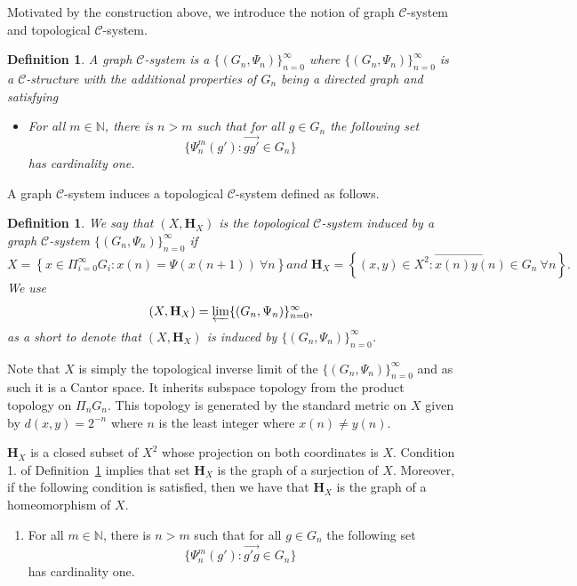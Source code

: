 \documentclass[11pt]{amsart}
\newtheorem{definition}[theorem]{Definition}
\newcommand{\N}{\mathbb{N}}  %
\newcommand{\oa}{\overrightarrow}
\newcommand{\homeocantor}{{\mathbf H}_{X}}
\newcommand{\cC}{\mathcal{C}}
\newcommand{\csystem}{\{(G_n,\Psi_n)\}_{n=0}^{\infty}}
\begin{document}
{Motivated by the construction above, we introduce the notion of graph $\cC$-system and topological $\cC$-system.

\begin{definition}\label{def:graphcsystem}
A \emph{graph $\cC$-system} is a  $\csystem$ where $\csystem$ is a $\cC$-structure with the additional properties of $G_n$ being a directed graph and satisfying 
\begin{itemize}
    \item[1.] \label{eq:continuous}  For all $m \in \N$, there is $n > m$ such that for all $g \in G_n$ the following set
        \[ \{\Psi^m_n(g'): \oa{gg'} \in G_n\} \
        \] has cardinality one. 
\end{itemize}
\end{definition}
 A graph $\cC$-system induces a topological $\cC$-system defined as follows.
\begin{definition}
We  say that \emph{$(X,\homeocantor)$} is the \emph{topological $\cC$-system} induced by a graph $\cC$-system $\csystem$ 
if
\[X = \left \{ x \in \Pi_{i=0}^{\infty}G_i: x(n) =\Psi(x(n+1)) \ \forall n  \right \} \textit {and } \homeocantor = \left \{ (x, y) \in X^2:  \oa{x(n)y(n)}  \in G_n \ \forall n \right \}.\]
We use \[ (X,\homeocantor) = \varprojlim\csystem,
\] as a short to denote that $(X,\homeocantor)$  is induced by $\csystem$.
\end{definition}

Note that $X$ is simply the topological inverse limit of the $\csystem$ and as such it is a Cantor space. It inherits subspace topology from the product topology on $\Pi_nG_n$. This topology is generated by the standard metric on $X$ given by $d(x,y)=2^{-n}$ where $n$ is the least integer where $x(n) \neq y(n)$. 

 $\homeocantor$ is a closed subset of $X^2$ whose projection on both coordinates is $X$. Condition 1. of Definition~\ref{def:graphcsystem} implies that  set $\homeocantor$ is the graph of a surjection of $X$.  Moreover, if the following condition is satisfied, then we have that $\homeocantor$ is the graph of a homeomorphism of $X$.

\begin{enumerate}
        \item [{\it 2.}] For all $m \in \N$, there is $n > m$ such that for all $g \in G_n$ the following set
        \[ \{\Psi^m_n(g'): \oa{g'g} \in G_n\} \
        \] has cardinality one. 
\end{enumerate}

}
\end{document}
